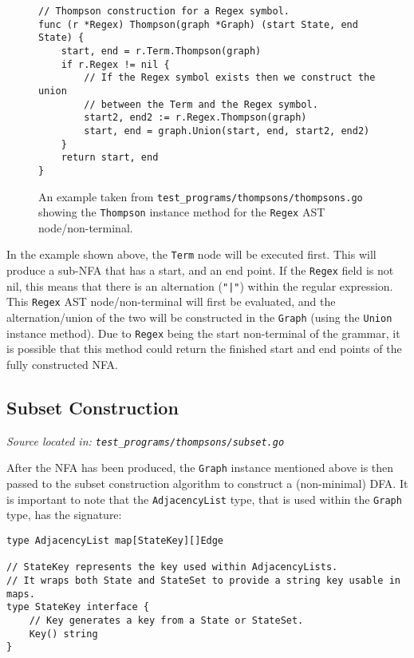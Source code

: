 \begin{figure}[H]
    \begin{verbatim}
// Thompson construction for a Regex symbol.
func (r *Regex) Thompson(graph *Graph) (start State, end State) {
    start, end = r.Term.Thompson(graph)
    if r.Regex != nil {
        // If the Regex symbol exists then we construct the union
        // between the Term and the Regex symbol.
        start2, end2 := r.Regex.Thompson(graph)
        start, end = graph.Union(start, end, start2, end2)
    }
    return start, end
}
    \end{verbatim}
    \cprotect\caption{An example taken from \verb|test_programs/thompsons/thompsons.go| showing the \verb|Thompson| instance method for the \verb|Regex| AST node/non-terminal.}
\end{figure}

In the example shown above, the \verb|Term| node will be executed first. This will produce a sub-NFA that has a start, and an end point. If the \verb|Regex| field is not nil, this means that there is an alternation (\verb+"|"+) within the regular expression. This \verb|Regex| AST node/non-terminal will first be evaluated, and the alternation/union of the two will be constructed in the \verb|Graph| (using the \verb|Union| instance method). Due to \verb|Regex| being the start non-terminal of the grammar, it is possible that this method could return the finished start and end points of the fully constructed NFA.

\subsection{Subset Construction}
\cprotect\textit{Source located in: \verb|test_programs/thompsons/subset.go|}

After the NFA has been produced, the \verb|Graph| instance mentioned above is then passed to the subset construction algorithm to construct a (non-minimal) DFA. It is important to note that the \verb|AdjacencyList| type, that is used within the \verb|Graph| type, has the signature:

\begin{verbatim}
type AdjacencyList map[StateKey][]Edge

// StateKey represents the key used within AdjacencyLists.
// It wraps both State and StateSet to provide a string key usable in maps.
type StateKey interface {
	// Key generates a key from a State or StateSet.
	Key() string
}
\end{verbatim}

